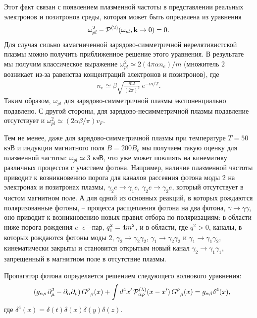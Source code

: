 Этот факт связан  с появлением плазменной частоты в представлении реальных электронов и позитронов среды, 
которая может быть определена из уравнения
%
\begin{equation}
\omega_{pl}^2 - {\cal P}^{(2)} (\omega_{pl}, {\mathbf k} \to 0 ) = 0.
\label{eq:omegapl}
\end{equation}
%
Для случая сильно замагниченной зарядово-симметричной нерелятивистской плазмы 
можно получить приближенное решение этого уравнения. В результате мы получим 
классическое выражение $\omega_{pl}^2 \simeq 2(4\pi \alpha n_{e})/m$ (множитель 
2 возникает из-за равенства концентраций электронов и позитронов), где
%
\begin{eqnarray}
n_{e} \simeq \beta \sqrt{\frac{m T}{(2\pi)^3}}\,e^{-m/T}.
\label{eq:ne}
\end{eqnarray}
\noindent Таким образом, $\omega_{pl}$ для зарядово-симметричной плазмы экспоненциально подавлено. С другой стороны, для зарядово-несимметричной плазмы подавление отсутствует и $\omega_{pl}^2 \simeq (2\alpha \beta/\pi)v_F$.

Тем не менее, даже для зарядово-симметричной плазмы при температуре $T=50$ кэВ 
и индукции магнитного поля $B=200 B_e$ мы получаем такую оценку для плазменной 
частоты: $\omega_{pl} \simeq 3$ кэВ, что уже может повлиять на кинематику 
различных процессов с участием фотона. Например, наличие плазменной частоты 
приводит к возникновению порога для каналов рассеяния фотона моды 2 на 
электронах и позитронах плазмы, $\gamma_2 e \to \gamma_1 e$, $\gamma_2 e \to 
\gamma_2 e$, который отсутствует в чистом магнитном поле. А для одной из 
основных реакций, в которых рождаются поляризованные фотоны, -- процесса 
расщепления фотона на два фотона, $\gamma \to \gamma \gamma$, оно приводит к 
возникновению новых правил отбора по поляризациям: в области ниже порога 
рождения $e^+e^-$-пар, $q^2_{\mbox{\tiny $\|$}} = 4 m^2$, и в области, где $q^2 > 0$, 
каналы, в которых рождаются фотоны моды 2, $\gamma_2 \to \gamma_2 \gamma_2$,
$\gamma_1 \to \gamma_2 \gamma_2$ и $\gamma_1 \to \gamma_1 \gamma_2$, кинематически закрыты и становится открытым новый канал $\gamma_2 \to \gamma_1 \gamma_1$, запрещенный в магнитном поле в отсутствие плазмы.

Пропагатор фотона определяется решением следующего волнового уравнения:
\begin{eqnarray}\label{eq:WaveEq}
	\nonumber
	&& 
	(g_{\alpha \rho} \, \partial_{\mu}^2  -
	\partial_{\alpha}\partial_{\rho}) \, G^{\rho}_{\phantom{x}\beta}(x) + 
	\int d^4 x'\, {\cal P}^{(\lambda)}_{\alpha\rho} (x - x') \, 
	G^{\rho}_{\phantom{x}\beta}(x)
	\nonumber= g_{\alpha\beta}\delta^4(x),
	\label{eq:2}
\end{eqnarray}
где $\delta^4(x)=\delta(t)\delta(x)\delta(y)\delta(z)$. 

